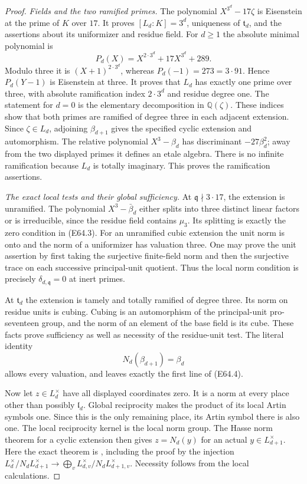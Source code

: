 \begin{proof}
\emph{Fields and the two ramified primes.}
The polynomial $X^{3^d}-17\zeta$ is Eisenstein at the prime of $K$
over $17$. It proves $[L_d:K]=3^d$, uniqueness of $\mathfrak t_d$,
and the assertions about its uniformizer and residue field.
For $d\ge1$ the absolute minimal polynomial is
\[
 P_d(X)=X^{2\cdot3^d}+17X^{3^d}+289.
 \tag{E64.11}
\]
Modulo three it is $(X+1)^{2\cdot3^d}$, whereas
$P_d(-1)=273=3\cdot91$. Hence $P_d(Y-1)$ is Eisenstein at three.
It proves that $L_d$ has exactly one prime over three, with absolute
ramification index $2\cdot3^d$ and residue degree one.
The statement for $d=0$ is the elementary decomposition in
$\mathbb Q(\zeta)$.
These indices show that both primes are ramified of degree three
in each adjacent extension.
Since $\zeta\in L_d$, adjoining $\beta_{d+1}$ gives the specified
cyclic extension and automorphism.
The relative polynomial $X^3-\beta_d$ has discriminant
$-27\beta_d^2$; away from the two displayed primes it defines an
etale algebra. There is no infinite ramification because $L_d$ is
totally imaginary. This proves the ramification assertions.

\emph{The exact local tests and their global sufficiency.}
At $\mathfrak q\nmid3\cdot17$, the extension is unramified.
The polynomial $X^3-\bar\beta_d$ either splits into three distinct
linear factors or is irreducible, since the residue field contains
$\mu_3$. Its splitting is exactly the zero condition in (E64.3).
For an unramified cubic extension the unit norm is onto and the
norm of a uniformizer has valuation three.
One may prove the unit assertion by first taking the surjective
finite-field norm and then the surjective trace on each successive
principal-unit quotient. Thus the local norm condition is precisely
$\delta_{d,\mathfrak q}=0$ at inert primes.

At $\mathfrak t_d$ the extension is tamely and totally ramified of
degree three. Its norm on residue units is cubing.
Cubing is an automorphism of the principal-unit pro-seventeen group,
and the norm of an element of the base field is its cube.
These facts prove sufficiency as well as necessity of the
residue-unit test. The literal identity
\[
                 N_d(\beta_{d+1})=\beta_d
 \tag{E64.12}
\]
allows every valuation, and leaves exactly the first line of
(E64.4).

Now let $z\in L_d^\times$ have all displayed coordinates zero.
It is a norm at every place other than possibly $\mathfrak l_d$.
Global reciprocity makes the product of its local Artin symbols one.
Since this is the only remaining place, its Artin symbol there is
also one. The local reciprocity kernel is the local norm group.
The Hasse norm theorem for a cyclic extension then gives
$z=N_d(y)$ for an actual $y\in L_{d+1}^\times$.
Here the exact theorem is \cite[VIII, Theorem3.1]{E_MilneCFT},
including the proof by the injection
$L_d^\times/N_dL_{d+1}^\times
\to\bigoplus_vL_{d,v}^\times/N_dL_{d+1,v}^\times$.
Necessity follows from the local calculations.


\end{proof}
